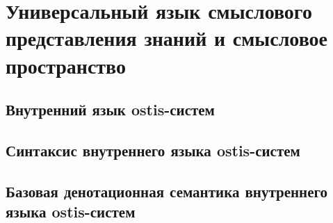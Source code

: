 \chapter{Универсальный язык смыслового представления знаний и смысловое пространство}
\label{chapter_sc_code}


\section{Внутренний язык ostis-систем}
\section{Синтаксис внутреннего языка ostis-систем}
\section{Базовая денотационная семантика внутреннего языка ostis-систем}

%
